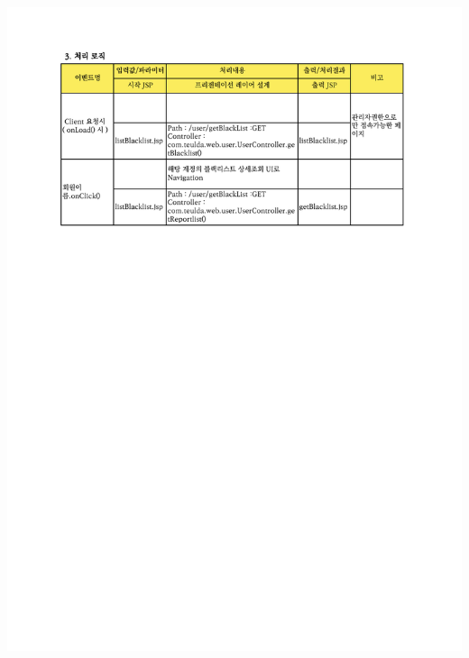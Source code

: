 {{{{{{{{{{{{{{\includegraphics[width=20cm]{./Figure/Design/Display/user/user_14.pdf} \\
}}}}}}}}}}}}}}
